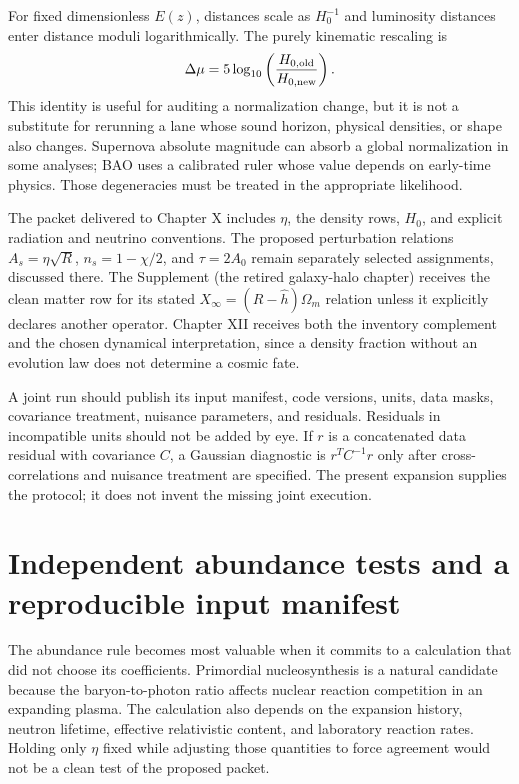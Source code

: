 For fixed dimensionless $E(z)$, distances scale as $H_0^{-1}$ and luminosity distances enter distance moduli logarithmically. The purely kinematic rescaling is
\begin{equation}
 \Delta\mu=5\log_{10}\left(\frac{H_{0,\rm old}}{H_{0,\rm new}}\right).
 \label{c8:modulus}
\end{equation}
This identity is useful for auditing a normalization change, but it is not a substitute for rerunning a lane whose sound horizon, physical densities, or shape also changes. Supernova absolute magnitude can absorb a global normalization in some analyses; BAO uses a calibrated ruler whose value depends on early-time physics. Those degeneracies must be treated in the appropriate likelihood.

The packet delivered to Chapter X includes $\eta$, the density rows, $H_0$, and explicit radiation and neutrino conventions. The proposed perturbation relations $A_s=\eta\sqrt R$, $n_s=1-\chi/2$, and $\tau=2A_0$ remain separately selected assignments, discussed there. The Supplement (the retired galaxy-halo chapter) receives the clean matter row for its stated $X_\infty=(R-\widehat h)\Omega_m$ relation unless it explicitly declares another operator. Chapter XII receives both the inventory complement and the chosen dynamical interpretation, since a density fraction without an evolution law does not determine a cosmic fate.

A joint run should publish its input manifest, code versions, units, data masks, covariance treatment, nuisance parameters, and residuals. Residuals in incompatible units should not be added by eye. If $r$ is a concatenated data residual with covariance $C$, a Gaussian diagnostic is $r^TC^{-1}r$ only after cross-correlations and nuisance treatment are specified. The present expansion supplies the protocol; it does not invent the missing joint execution.

\section{Independent abundance tests and a reproducible input manifest}
The abundance rule becomes most valuable when it commits to a calculation that did not choose its coefficients. Primordial nucleosynthesis is a natural candidate because the baryon-to-photon ratio affects nuclear reaction competition in an expanding plasma. The calculation also depends on the expansion history, neutron lifetime, effective relativistic content, and laboratory reaction rates. Holding only $\eta$ fixed while adjusting those quantities to force agreement would not be a clean test of the proposed packet.

